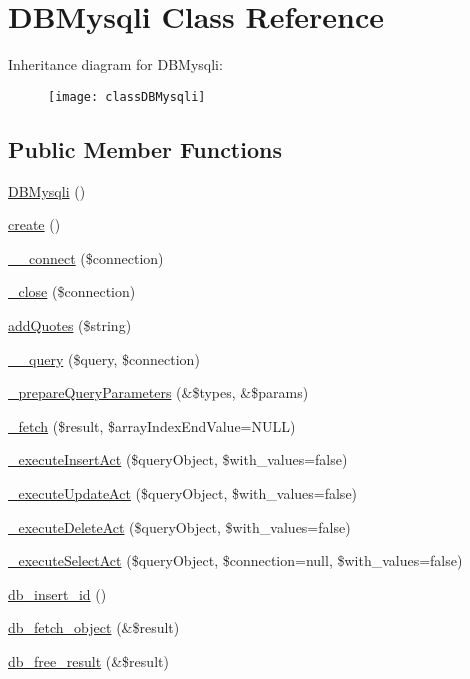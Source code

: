 \hypertarget{classDBMysqli}{}\section{D\+B\+Mysqli Class Reference}
\label{classDBMysqli}
Inheritance diagram for D\+B\+Mysqli\+:\begin{figure}[H]
\begin{center}
\leavevmode
\texttt{[image: classDBMysqli]}
\end{center}
\end{figure}
\subsection*{Public Member Functions}
\begin{DoxyCompactItemize}
\item 
\hyperlink{classDBMysqli_a907425710f00306d10897cb1f76719ca}{D\+B\+Mysqli} ()
\item 
\hyperlink{classDBMysqli_a589dd45054eb50e666c3a57815631111}{create} ()
\item 
\hyperlink{classDBMysqli_a7c041395f7926e0ec84186aa9eabc138}{\+\_\+\+\_\+connect} (\$connection)
\item 
\hyperlink{classDBMysqli_afd6324d65eaf95dbd8e6fa2f97b9b9db}{\+\_\+close} (\$connection)
\item 
\hyperlink{classDBMysqli_a29266a97d63be11763eb24926d39f544}{add\+Quotes} (\$string)
\item 
\hyperlink{classDBMysqli_aa7e47178c283abd8ba1bb7c8d0a31c66}{\+\_\+\+\_\+query} (\$query, \$connection)
\item 
\hyperlink{classDBMysqli_ab884208e90c71708faca2e56c5da0666}{\+\_\+prepare\+Query\+Parameters} (\&\$types, \&\$params)
\item 
\hyperlink{classDBMysqli_a4b5becb1ab24b99a184fe1942bc73280}{\+\_\+fetch} (\$result, \$array\+Index\+End\+Value=N\+U\+L\+L)
\item 
\hyperlink{classDBMysqli_a6a62a12cd9c46aac0242e81f58a25803}{\+\_\+execute\+Insert\+Act} (\$query\+Object, \$with\+\_\+values=false)
\item 
\hyperlink{classDBMysqli_acc5f5408c3717c88411a238e1e176785}{\+\_\+execute\+Update\+Act} (\$query\+Object, \$with\+\_\+values=false)
\item 
\hyperlink{classDBMysqli_a3dc572c5b452c7a2e0e150f6b8af622e}{\+\_\+execute\+Delete\+Act} (\$query\+Object, \$with\+\_\+values=false)
\item 
\hyperlink{classDBMysqli_a76e3f67b339c7613ad1d6e33af04e51e}{\+\_\+execute\+Select\+Act} (\$query\+Object, \$connection=null, \$with\+\_\+values=false)
\item 
\hyperlink{classDBMysqli_a080939c13758f00ecd0092eda6cd2452}{db\+\_\+insert\+\_\+id} ()
\item 
\hyperlink{classDBMysqli_a9e173fea0afa5c419977be95d1859892}{db\+\_\+fetch\+\_\+object} (\&\$result)
\item 
\hyperlink{classDBMysqli_a8639ebaca8bae119797a084af68750cc}{db\+\_\+free\+\_\+result} (\&\$result)
\end{DoxyCompactItemize}
